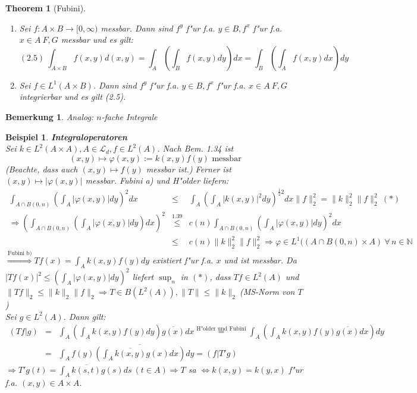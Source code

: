 \documentclass[a4paper,11pt]{book}
\newcommand{\N}{{\mathbb N}}
\newcommand{\ssL}{{\mathcal L}}
\newtheorem*{TheoNO}{Theorem}
\newtheorem{Bsp}[Def]{Beispiel}
\newtheorem*{BemNO}{Bemerkung}
\theoremstyle{nonumberplain}
\begin{document}
\begin{TheoNO}[Fubini]
\begin{enumerate}
\item[a)] Sei $f: A \times B \rightarrow [0,\infty)$ messbar. Dann sind $f^y$ f"ur f.a. $y \in B, f^x$ f"ur f.a. $x \in A \ F,G$ messbar und es gilt:
\[
(2.5) \ \int_{A \times B} f(x,y)d(x,y) = \int_A ( \int_B f(x,y)dy)dx = \int_B ( \int_A f(x,y)dx)dy
\]

\item[b)] Sei $f \in L^1(A \times B)$. Dann sind $f^y$ f"ur f.a. $y \in B, f^x$ f"ur f.a. $x \in A \ F,G$ integrierbar und es gilt (2.5).
\end{enumerate}
\end{TheoNO}


\begin{BemNO}
Analog: $n$-fache Integrale
\end{BemNO}


\begin{Bsp}
\textbf{Integraloperatoren}\\
Sei $k \in L^2(A \times A), A \in \ssL_d, f \in L^2(A)$. Nach Bem. 1.34 ist
\[
(x,y) \mapsto \varphi(x,y) := k(x,y)f(y) \text{ messbar}
\]
(Beachte, dass auch $(x,y) \mapsto f(y)$ messbar ist.) Ferner ist $(x,y) \mapsto |\varphi(x,y)|$ messbar. Fubini a) und H"older liefern:
\begin{eqnarray*}
\int_{A \cap B(0,n)} ( \int_A |\varphi(x,y)|dy)^2 dx & \leq & \int_A ( \int_A |k(x,y)|^2 dy)^{\frac12 2} dx \|f\|_2^2 = \|k\|_2^2 \|f\|_2^2 \ (\ast)\\
\Rightarrow ( \int_{A \cap B(0,n)} ( \int_A |\varphi(x,y)|dy)dx)^2 & \stackrel{1.39}{\leq} & c(n) \int_{A \cap B(0,n)} ( \int_A |\varphi(x,y)|dy)^2 dx\\
& \leq & c(n) \|k\|_2^2 \|f\|_2^2 \Rightarrow \varphi \in L^1((A \cap B(0,n) \times A) \ \forall\, n \in \N
\end{eqnarray*}
$\stackrel{\text{Fubini b)}}{\Rightarrow} Tf(x) = \int_A k(x,y)f(y)dy$ existiert f"ur f.a. $x$ und ist messbar. Da $|Tf(x)|^2 \leq (\int_A |\varphi(x,y)|dy)^2$ liefert $\sup_n$ in $(\ast)$, dass $Tf \in L^2(A)$ und $\|Tf\|_2 \leq \|k\|_2 \|f\|_2 \Rightarrow T \in B(L^2(A)), \|T\| \leq \|k\|_2 \ $(MS-Norm von $T$)\\
Sei $g \in L^2(A)$. Dann gilt:
\begin{eqnarray*}
(Tf|g) & = & \int_A (\int_A k(x,y)f(y)dy)\overline{g(x)}dx \stackrel{\text{H"older und Fubini}}{=} \int_A (\int_A k(x,y)f(y)\overline{g(x)} dx)dy \\
& = & \int_A f(y) \overline{(\int_A \overline{k(x,y)} g(x) dx)}dy = (f|T'g)
\end{eqnarray*}
$\Rightarrow T'g(t) = \int_A \overline{k(s,t)}g(s) ds \ (t \in A) \Rightarrow T$ sa $\Longleftrightarrow k(x,y) = k(y,x)$ f"ur f.a. $(x,y) \in A \times A$.
\end{Bsp}
\end{document}
